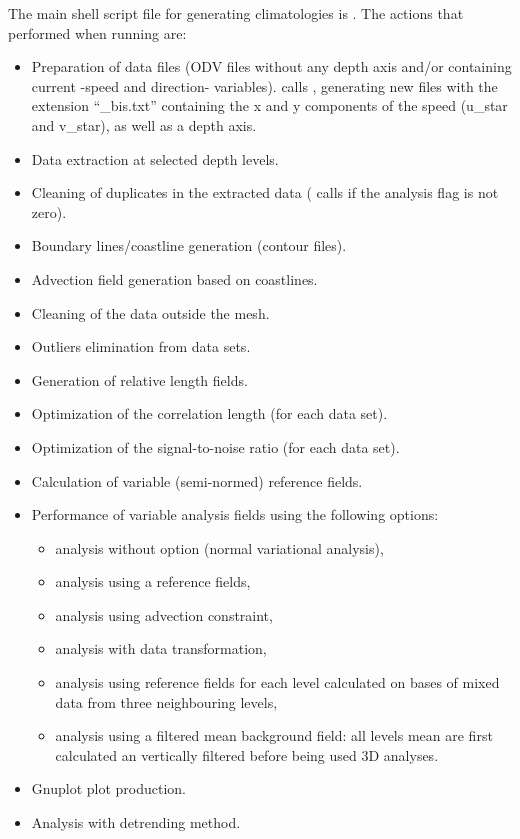 The main shell script file for generating climatologies is . The actions that performed when running  are:

\begin{itemize}
\item Preparation of data files (ODV files without any depth axis and/or containing current -speed and direction- variables).  calls , generating new files with the extension ``\_bis.txt'' containing the x and y components of the speed (u\_star and v\_star), as well as a depth axis.
\item Data extraction at selected depth levels.
\item Cleaning of duplicates in the extracted data ( calls  if the analysis flag is not zero).
\item Boundary lines/coastline generation (contour files).
\item Advection field generation based on coastlines.
\item Cleaning of the data outside the mesh.
\item Outliers elimination from data sets.
\item Generation of relative length fields.
\item Optimization of the correlation length (for each data set).
\item Optimization of the signal-to-noise ratio (for each data set).
\item Calculation of variable (semi-normed) reference fields.
\item Performance of variable analysis fields using the following options:
\begin{itemize}
\item analysis without option (normal variational analysis),
\item analysis using a reference fields,
\item analysis using advection constraint,
\item analysis with data transformation,
\item analysis using reference fields for each level calculated on bases of mixed data from three  neighbouring levels,
\item analysis using a filtered mean background field: all levels mean are first calculated an vertically filtered before being used 3D analyses.
\end{itemize}
\item Gnuplot plot production.
\item Analysis with detrending method.
\end{itemize}

